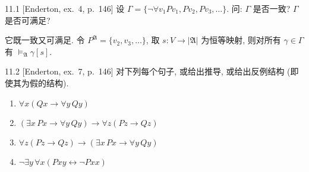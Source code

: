 
\begin{exercise}{11.1}
  [Enderton, ex.~4, p.~146]
  设 $\Gamma=\{\neg\forall v_1 P v_1, Pv_2, Pv_3,\dots\}$. 问: $\Gamma$ 是否一致? $\Gamma$ 是否可满足?
\end{exercise}

它既一致又可满足. 令 $P^{\mathfrak{A}}=\{v_2,v_3,\dots\}$, 取 $s:V\rightarrow|\mathfrak{A}|$ 为恒等映射, 则对所有 $\gamma\in\Gamma$ 有 $\vDash_{\mathfrak{A}}\gamma[s]$.

\begin{exercise}{11.2}
  [Enderton, ex.~7, p.~146]
  对下列每个句子, 或给出推导, 或给出反例结构 (即使其为假的结构).
  \begin{enumerate}[label=(\alph*)]
    \item $\forall x (Qx \rightarrow \forall y \, Qy)$
    \item $(\exists x \, Px \rightarrow \forall y \, Qy) \rightarrow \forall z (Pz \rightarrow Qz)$
    \item $\forall z (Pz \rightarrow Qz) \rightarrow (\exists x \, Px \rightarrow \forall y \, Qy)$
    \item $\neg \exists y \, \forall x (Pxy \leftrightarrow \neg Pxx)$\qedhere
  \end{enumerate}
\end{exercise}

